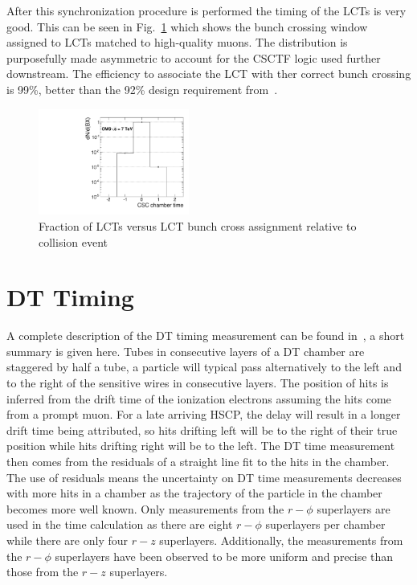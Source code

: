 After this synchronization procedure is performed the timing of the LCTs is very good. This can be seen in Fig.~\ref{fig:ALCTBX} which shows the bunch crossing window
assigned to LCTs matched to high-quality muons. The distribution is purposefully made asymmetric to account for the CSCTF logic used further downstream.
The efficiency to associate the LCT with ther correct bunch crossing is 99\%, better than the 92\% design requirement from~\cite{Chatrchyan:2008zzk}.

\begin{figure}
  \begin{center}
      \includegraphics[clip=true, width=0.44\textwidth]{figures/timing/ALCT_Bx}
      \caption[Fraction of LCTs versus LCT bunch crossing window assignment relative to collision event]
      {Fraction of LCTs versus LCT bunch cross assignment relative to collision event
        }
      \label{fig:ALCTBX}
  \end{center}
\end{figure}

\section{DT Timing}

A complete description of the DT timing measurement can be found in~\cite{2007AN049}, a short summary is given here.
Tubes in consecutive layers of a DT chamber are staggered by half a tube, a particle will typical pass alternatively to the left and to the right of the
sensitive wires in consecutive layers.
The position of hits is inferred from the drift time of the ionization electrons assuming the hits come from a prompt muon.
For a late arriving HSCP, the delay will result in a longer drift time being attributed, so hits drifting
left will be to the right of their true position while hits drifting right will be to the left.
The DT time measurement then comes from the residuals of a straight line fit to the hits in the chamber.
The use of residuals means the uncertainty on DT time measurements decreases with more hits in a chamber as the trajectory of the particle in the
chamber becomes more well known. Only measurements from the $r-\phi$ superlayers are used in the time calculation as there are eight $r-\phi$ superlayers
per chamber while there are only four $r-z$ superlayers. Additionally, the measurements from the $r-\phi$ superlayers have been observed to be more uniform and precise than
those from the $r-z$ superlayers.

